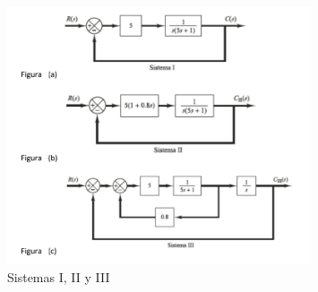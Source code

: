 \documentclass[10pt]{article}
\theoremstyle{definition}
\theoremstyle{remark}
\theoremstyle{definition}
\numberwithin{equation}{prob}
\begin{document}
\begin{figure}[h]
	\centering
	\includegraphics[width=0.8\textwidth]{./figures/Figura 9 ejercicio 7.png}
	\caption{Sistemas I, II y III}
\end{figure}
\end{document}
